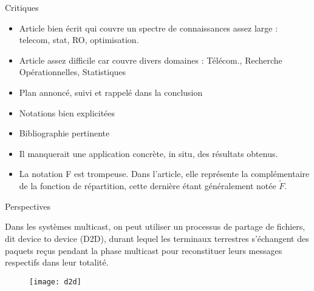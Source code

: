 \begin{frame} {Critiques}
\begin{itemize}
	\item Article bien écrit qui couvre un spectre de connaissances assez large : telecom, stat, RO, optimisation.
	\item Article assez difficile car couvre divers domaines : Télécom., Recherche Opérationnelles, Statistiques
	\item Plan annoncé, suivi et rappelé dans la conclusion
	\item Notations bien explicitées
	\item Bibliographie pertinente
	\item Il manquerait une application concrète, in situ, des résultats obtenus.
	\item La notation F est trompeuse. Dans l'article, elle représente la complémentaire de la fonction de répartition, cette dernière étant généralement notée $\tilde{F}$.
\end{itemize}


\end{frame}



\begin{frame} {Perspectives}

Dans les systèmes multicast, on peut utiliser un processus de partage de fichiers,
dit device to device (D2D), durant lequel les terminaux terrestres
s'échangent des paquets reçus pendant la phase multicast pour reconstituer leurs messages
respectifs dans leur totalité. 


\begin{figure}
	\centering
	\texttt{[image: d2d]}
	\label{fig:d2d}
\end{figure}


\end{frame}


%
%
